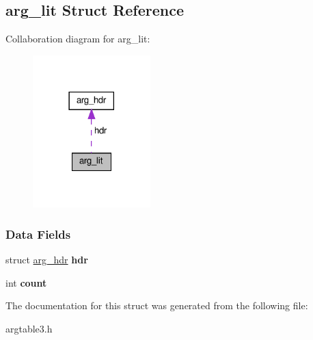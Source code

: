 \hypertarget{structarg__lit}{}\subsection{arg\+\_\+lit Struct Reference}
\label{structarg__lit}


Collaboration diagram for arg\+\_\+lit\+:\nopagebreak
\begin{figure}[H]
\begin{center}
\leavevmode
\includegraphics[width=129pt]{structarg__lit__coll__graph}
\end{center}
\end{figure}
\subsubsection*{Data Fields}
\begin{DoxyCompactItemize}
\item 
\mbox{\label{structarg__lit_ab01efa22bd97c4e4dd1f00a2626e85e9}} 
struct \hyperlink{structarg__hdr}{arg\+\_\+hdr} {\bfseries hdr}
\item 
\mbox{\label{structarg__lit_ab60f65d2cba968ee42e089047a39cf1c}} 
int {\bfseries count}
\end{DoxyCompactItemize}


The documentation for this struct was generated from the following file\+:\begin{DoxyCompactItemize}
\item 
argtable3.\+h\end{DoxyCompactItemize}
